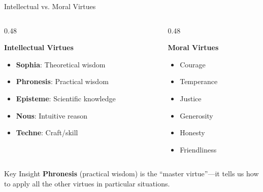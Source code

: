 \documentclass[aspectratio=169]{beamer}
\begin{document}
\begin{frame}{Intellectual vs. Moral Virtues}
\begin{columns}[T]
\begin{column}{0.48\textwidth}
\begin{block}{\textbf{Intellectual Virtues}}
\begin{itemize}
    \item \textbf{Sophia}: Theoretical wisdom
    \item \textbf{Phronesis}: Practical wisdom
    \item \textbf{Episteme}: Scientific knowledge
    \item \textbf{Nous}: Intuitive reason
    \item \textbf{Techne}: Craft/skill
\end{itemize}
\end{block}
\end{column}

\begin{column}{0.48\textwidth}
\begin{block}{\textbf{Moral Virtues}}
\begin{itemize}
    \item Courage
    \item Temperance
    \item Justice
    \item Generosity
    \item Honesty
    \item Friendliness
\end{itemize}
\end{block}
\end{column}
\end{columns}

\vspace{0.4cm}
\begin{alertblock}{Key Insight}
\textbf{Phronesis} (practical wisdom) is the ``master virtue''---it tells us how to apply all the other virtues in particular situations.
\end{alertblock}
\end{frame}
\end{document}
